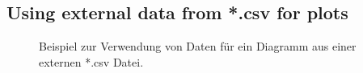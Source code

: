 
\subsection{Using external data from *.csv for plots}
\begin{figure}
	\centering
	\caption{Beispiel zur Verwendung von Daten für ein Diagramm aus einer externen *.csv Datei.}
	\label{fig:my_label}
\end{figure}